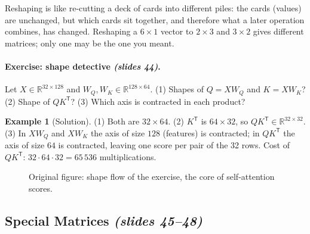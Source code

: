 \documentclass[11pt,a4paper]{article}
\newcommand{\R}{\mathbb{R}}
\newcommand{\T}{^{\mathsf{T}}}
\newcommand{\slides}[1]{\texorpdfstring{\emph{(slides #1)}}{(slides #1)}}
\theoremstyle{definition}
\newtheorem{example}[definition]{Example}
\theoremstyle{plain}
\begin{document}
\begin{intuition}
Reshaping is like re-cutting a deck of cards into different piles: the cards (values) are unchanged, but which cards sit together, and therefore what a later operation combines, has changed. Reshaping a $6\times1$ vector to $2\times3$ and $3\times2$ gives different matrices; only one may be the one you meant.
\end{intuition}

\paragraph{Exercise: shape detective \slides{44}.} Let $X\in\R^{32\times128}$ and $W_Q,W_K\in\R^{128\times64}$. (1) Shapes of $Q=XW_Q$ and $K=XW_K$? (2) Shape of $QK\T$? (3) Which axis is contracted in each product?

\begin{example}[Solution]
(1) Both are $32\times64$. (2) $K\T$ is $64\times32$, so $QK\T\in\R^{32\times32}$. (3) In $XW_Q$ and $XW_K$ the axis of size $128$ (features) is contracted; in $QK\T$ the axis of size $64$ is contracted, leaving one score per pair of the 32 rows. Cost of $QK\T$: $32\cdot64\cdot32=65\,536$ multiplications.
\end{example}

\begin{figure}[ht]
\centering
{}
\caption{Original figure: shape flow of the exercise, the core of self-attention scores.}
\end{figure}

\subsection{Special Matrices \slides{45--48}}
\end{document}
